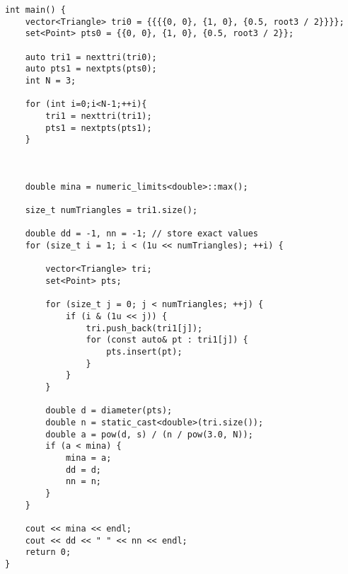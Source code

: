 \begin{verbatim}
int main() {
    vector<Triangle> tri0 = {{{{0, 0}, {1, 0}, {0.5, root3 / 2}}}};
    set<Point> pts0 = {{0, 0}, {1, 0}, {0.5, root3 / 2}};

    auto tri1 = nexttri(tri0);
    auto pts1 = nextpts(pts0);
    int N = 3;

    for (int i=0;i<N-1;++i){
        tri1 = nexttri(tri1);
        pts1 = nextpts(pts1);
    }



    double mina = numeric_limits<double>::max();

    size_t numTriangles = tri1.size();

    double dd = -1, nn = -1; // store exact values
    for (size_t i = 1; i < (1u << numTriangles); ++i) {
        
        vector<Triangle> tri;
        set<Point> pts;

        for (size_t j = 0; j < numTriangles; ++j) {
            if (i & (1u << j)) {
                tri.push_back(tri1[j]);
                for (const auto& pt : tri1[j]) {
                    pts.insert(pt);
                }
            }
        }

        double d = diameter(pts);
        double n = static_cast<double>(tri.size());
        double a = pow(d, s) / (n / pow(3.0, N));
        if (a < mina) {
            mina = a;
            dd = d;
            nn = n;
        }
    }

    cout << mina << endl;
    cout << dd << " " << nn << endl;
    return 0;
}
\end{verbatim}
